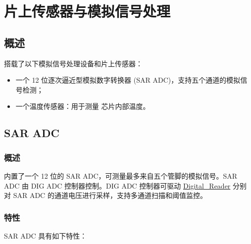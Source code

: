 \documentclass[main\_\_CN.tex]{subfiles}
\begin{document}

\ifglobal
\else
    {\let\clearpage\relax \listoftodos}
    {\let\clearpage\relax \listofdonetodos}
    \tableofcontents
\fi



\hypertarget{sensor}{}
\chapter{片上传感器与模拟信号处理}
\label{mod:sensor}

\section{概述}

\chipname{} 搭载了以下模拟信号处理设备和片上传感器：

\begin{itemize}
    \item 一个 12 位逐次逼近型模拟数字转换器 (SAR ADC)，支持五个通道的模拟信号检测；
    \item 一个温度传感器：用于测量 \chipname{} 芯片内部温度。

\end{itemize}

\section{SAR ADC}\label{sec:saradc}

\subsection{概述}

\chipname{} 内置了一个 12 位的 SAR ADC，可测量最多来自五个管脚的模拟信号。SAR ADC 由 DIG ADC 控制器控制。DIG ADC 控制器可驱动 \hyperref[block:digital-reader0]{Digital\_Reader} 分别对 SAR ADC 的通道电压进行采样，支持多通道扫描和阈值监控。

\subsection{特性}

SAR ADC 具有如下特性：
\end{document}

